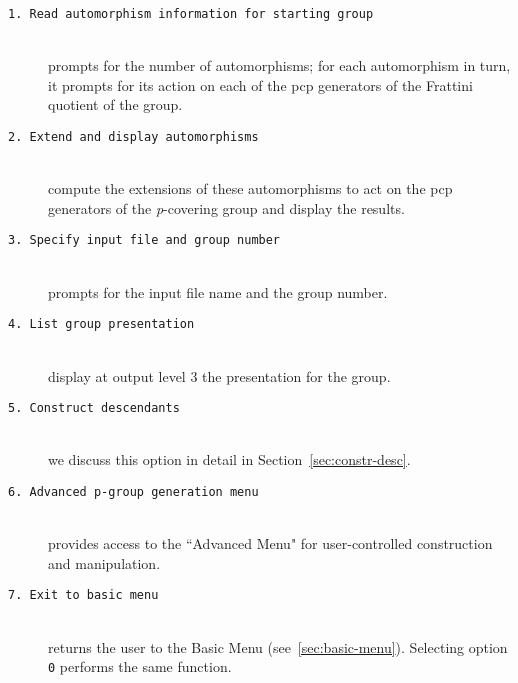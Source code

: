 \documentclass[12pt]{article}
\begin{document}
\begin{description}
\item[\texttt{1.\ Read automorphism information for starting group}]\ \\
 prompts for the number of automorphisms; for each automorphism
 in turn, it prompts for its action on each of the pcp
 generators of the Frattini quotient of the group. 

\item[\texttt{2.\ Extend and display automorphisms}]\ \\
 compute the extensions of these automorphisms to act on the pcp generators
 of the {\it p}-covering group and display the results. 

\item[\texttt{3.\ Specify input file and group number}]\ \\
 prompts for the input file name and the group number.

\item[\texttt{4.\ List group presentation}]\ \\
 display at output level 3 the presentation for the group.

\item[\texttt{5.\ Construct descendants}]\ \\
 we discuss this option in detail in Section~\ref{sec:constr-desc}.

\item[\texttt{6.\ Advanced p-group generation menu}]\ \\
 provides access to the ``Advanced Menu" 
 for user-controlled construction and manipulation.

\item[\texttt{7.\ Exit to basic menu}]\ \\
 returns the user to the Basic Menu (see~\ref{sec:basic-menu}).
 Selecting option \texttt{0} performs the same function.
 
\end{description}
\end{document}
